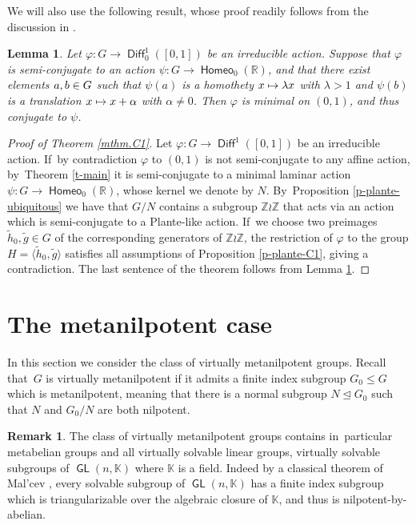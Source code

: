 \documentclass[JEP,XML,SOM,Unicode,NoFloatCountersInSection,published]{cedram}
\def\mto{\mathchoice{\longmapsto}{\mapsto}{\mapsto}{\mapsto}}
\newtheorem{lem}[thm]{Lemma}
\theoremstyle{definition}
\newtheorem{rem}[thm]{Remark}
\DeclareMathOperator{\Diff}{\mathsf{Diff}}
\DeclareMathOperator{\homeo}{\mathsf{Homeo}}
\DeclareMathOperator{\GL}{\mathsf{GL}}
\newcommand{\R}{\mathbb{R}}
\newcommand{\Z}{\mathbb Z}
\begin{document}
We will also use the following result, whose proof readily follows from the discussion in \cite[\S 4.2]{BMNR}.
\begin{lem} \label{l-upgrade-to-conjugacy}
Let $\varphi\colon G\to \Diff_0^1([0, 1])$ be an irreducible action. Suppose that $\varphi$ is semi-conjugate to an action $\psi\colon G\to \homeo_0(\R)$, and that there exist elements $a, b\in\nobreak G$ such that $\psi(a)$ is a homothety $x\mto \lambda x$ with $\lambda>1$ and $\psi(b)$ is a translation $x\mto x+\alpha$ with $ \alpha \neq 0$. Then $\varphi$ is minimal on $(0, 1)$, and thus conjugate to $\psi$.
\end{lem}

\begin{proof}[Proof of Theorem \ref{mthm.C1}]
Let $\varphi\colon G\to \Diff^1([0,1])$ be an irreducible action. If~by contradiction $\varphi$ to $(0, 1)$ is not semi-conjugate to any affine action, by~Theorem \ref{t-main} it is semi-conjugate to a minimal laminar action $\psi\colon G\to \homeo_0(\R)$, whose kernel we denote by $N$. By~Proposition \ref{p-plante-ubiquitous} we have that $G/N$ contains a subgroup $ \Z \wr \Z$ that acts via an action which is semi-conjugate to a Plante-like action. If~we choose two preimages $\widetilde{h}_0,\widetilde{g}\in G$ of the corresponding generators of $\Z \wr \Z$, the restriction of $\varphi$ to the group $H= \langle \widetilde{h}_0, \widetilde{g} \rangle$ satisfies all assumptions of Proposition \ref{p-plante-C1}, giving a contradiction. The last sentence of the theorem follows from Lemma \ref{l-upgrade-to-conjugacy}.
\end{proof}

\section{The metanilpotent case} \label{s-metanilpotent}

In this section we consider the class of {virtually metanilpotent} groups. Recall that~$G$ is virtually metanilpotent if it admits a finite index subgroup $G_0\le G$ which is metanilpotent, meaning that there is a normal subgroup $N\unlhd G_0$ such that $N$ and $G_0/N$ are both nilpotent.

\begin{rem} \label{r-Malcev}
The class of virtually metanilpotent groups contains in~particular metabelian groups and all virtually solvable linear groups, \ie virtually solvable subgroups of $\GL(n, \mathbb{K})$ where $\mathbb{K}$ is a field. Indeed by a classical theorem of Mal'cev \cite{Malcev}, every solvable subgroup of $\GL(n, \mathbb{K})$ has a finite index subgroup which is triangularizable over the algebraic closure of $\mathbb{K}$, and thus is nilpotent-by-abelian.
\end{rem}
\end{document}
